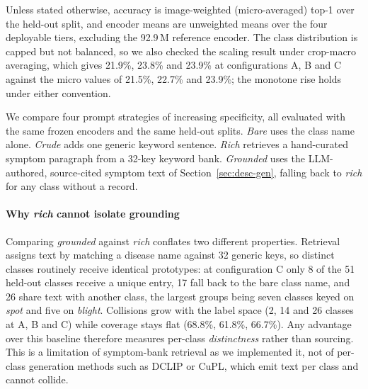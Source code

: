 \documentclass[a4paper,fleqn]{cas-dc}
\begin{document}

Unless stated otherwise, accuracy is image-weighted (micro-averaged) top-1 over the held-out
split, and encoder means are unweighted means over the four deployable tiers, excluding the
92.9\,M reference encoder. The class distribution is capped but not balanced, so we also
checked the scaling result under crop-macro averaging, which gives 21.9\%, 23.8\% and
23.9\% at configurations A, B and C against the micro values of 21.5\%, 22.7\% and
23.9\%; the monotone rise holds under either convention.

We compare four prompt strategies of increasing specificity, all evaluated with the same frozen
encoders and the same held-out splits. \emph{Bare} uses the class name alone. \emph{Crude} adds one
generic keyword sentence. \emph{Rich} retrieves a hand-curated symptom paragraph from a 32-key
keyword bank. \emph{Grounded} uses the LLM-authored, source-cited symptom text of
Section~\ref{sec:desc-gen}, falling back to \emph{rich} for any class without a record.

\paragraph{Why \emph{rich} cannot isolate grounding} Comparing \emph{grounded} against \emph{rich}
conflates two different properties. Retrieval assigns text by matching a disease name against 32
generic keys, so distinct classes routinely receive identical prototypes: at configuration C only 8
of the 51 held-out classes receive a unique entry, 17 fall back to the bare class name, and 26 share
text with another class, the largest groups being seven classes keyed on \emph{spot} and five on
\emph{blight}. Collisions grow with the label space (2, 14 and 26 classes at A, B and C) while
coverage stays flat (68.8\%, 61.8\%, 66.7\%). Any advantage over this baseline therefore measures
per-class \emph{distinctness} rather than sourcing. This is a limitation of symptom-bank retrieval as
we implemented it, not of per-class generation methods such as DCLIP or CuPL, which emit text per
class and cannot collide.
\end{document}
